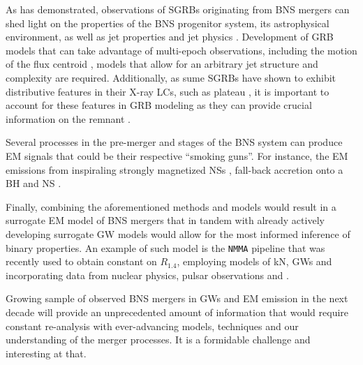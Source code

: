 As \GRB{} has demonstrated, observations of \acp{SGRB} originating from 
\ac{BNS} mergers can shed light on the properties of the \ac{BNS} 
progenitor system, its astrophysical environment, as well as jet properties 
and jet physics \citep[\eg][]{Hajela:2019mjy}. 
%
Development of \ac{GRB} models that can take advantage of multi-epoch observations, 
including the motion of the flux centroid \citep[\eg][]{Fernandez:2021xce}, models that 
allow for an arbitrary jet structure and complexity are required.
%
Additionally, as sume \acp{SGRB} have shown to exhibit distributive features 
in their X-ray \acp{LC}, such as plateau \citep{Kumar:2014upa}, it is important 
to account for these features in \ac{GRB} modeling as they can provide crucial 
information on the \pmerg{} remnant \citep[\eg][]{Gibson:2017dep}. 


Several processes in the pre-merger and \pmerg{} stages of the 
\ac{BNS} system can produce \ac{EM} signals that could be their respective 
``smoking guns''. 
%
For instance, the \ac{EM} emissions from inspiraling strongly magnetized \acp{NS} 
\citep[\eg][]{Beloborodov:2020ylo}, 
fall-back accretion onto a \ac{BH} \citep[\eg][]{Desai:2018rbc}
and \ac{NS} \citep[\eg][]{Gibson:2017dep}.


Finally, combining the aforementioned methods and models would result in a 
surrogate \ac{EM} model of \ac{BNS} mergers that in tandem with 
already actively developing surrogate \ac{GW} models would allow for 
the most informed inference of binary properties. 
%
An example of such model is the \texttt{NMMA} pipeline \citep{Dietrich:2020efo} that 
was recently used to obtain constant on $R_{1.4}$, 
employing models of \ac{kN}, \acp{GW} and incorporating 
data from nuclear physics, pulsar observations and \GW{}.

Growing sample of observed \ac{BNS} mergers in \acp{GW} and \ac{EM} emission 
in the next decade will provide an unprecedented amount of information 
that would require constant re-analysis with ever-advancing models, 
techniques and our understanding of the merger processes.
%
It is a formidable challenge and interesting at that. 
%


